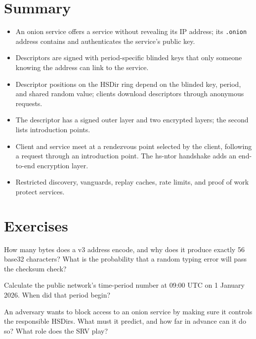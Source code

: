 \section*{Summary}
\begin{itemize}
  \item An onion service offers a service without revealing its IP address; its \texttt{.onion} address contains and authenticates the service's public key.
  \item Descriptors are signed with period-specific blinded keys that only someone knowing the address can link to the service.
  \item Descriptor positions on the HSDir ring depend on the blinded key, period, and shared random value; clients download descriptors through anonymous requests.
  \item The descriptor has a signed outer layer and two encrypted layers; the second lists introduction points.
  \item Client and service meet at a rendezvous point selected by the client, following a request through an introduction point. The hs-ntor handshake adds an end-to-end encryption layer.
  \item Restricted discovery, vanguards, replay caches, rate limits, and proof of work protect services.
\end{itemize}

\section*{Exercises}

\begin{esercizio}[1]\label{es:14-indirizzo}
How many bytes does a v3 address encode, and why does it produce exactly 56 base32 characters? What is the probability that a random typing error will pass the checksum check?
\end{esercizio}

\begin{esercizio}[1]\label{es:14-periodo}
Calculate the public network's time-period number at 09:00 UTC on 1 January 2026. When did that period begin?
\end{esercizio}

\begin{esercizio}[2]\label{es:14-hsdir}
An adversary wants to block access to an onion service by making sure it controls the responsible HSDirs. What must it predict, and how far in advance can it do so? What role does the SRV play?
\end{esercizio}

